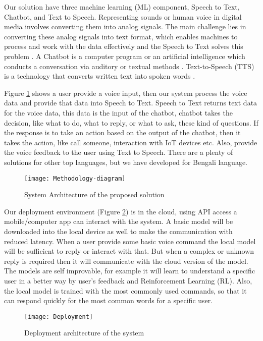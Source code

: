 Our solution have three machine learning (ML) component, Speech to Text, Chatbot, and Text to Speech.
Representing sounds or human voice in digital media involves converting them into analog signals.
The main challenge lies in converting these analog signals into text format, which enables machines to process and work with the data effectively and the Speech to Text solves this problem \cite{speech-recog-bengali}.
A Chatbot is a computer program or an artificial intelligence which conducts a conversation via auditory or textual methods \cite{chatbot}.
Text-to-Speech (TTS) is a technology that converts written text into spoken words \cite{text-to-speech}.

Figure \ref{fig:methodology} shows a user provide a voice input, then our system process the voice data and provide that data into Speech to Text.
Speech to Text returns text data for the voice data, this data is the input of the chatbot, chatbot takes the decision, like what to do, what to reply, or what to ask, these kind of questions.
If the response is to take an action based on the output of the chatbot, then it takes the action, like call someone, interaction with IoT devices etc.
Also, provide the voice feedback to the user using Text to Speech.
There are a plenty of solutions for other top languages, but we have developed for Bengali language.

\begin{figure}
    \centering
    \texttt{[image: Methodology-diagram]}
    \caption{System Architecture of the proposed solution}\label{fig:methodology}
\end{figure}

Our deployment environment (Figure \ref{fig:deployment}) is in the cloud, using API access a mobile/computer app can interact with the system.
A basic model will be downloaded into the local device as well to make the communication with reduced latency.
When a user provide some basic voice command the local model will be sufficient to reply or interact with that.
But when a complex or unknown reply is required then it will communicate with the cloud version of the model.
The models are self improvable, for example it will learn to understand a specific user in a better way by user's feedback and Reinforcement Learning (RL).
Also, the local model is trained with the most commonly used commands, so that it can respond quickly for the most common words for a specific user.

\begin{figure}
    \centering
    \texttt{[image: Deployment]}
    \caption{Deployment architecture of the system}\label{fig:deployment}
\end{figure}
